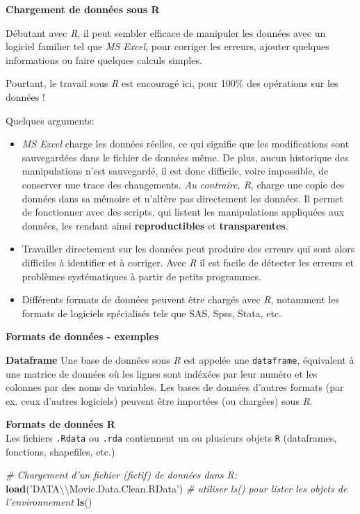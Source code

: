 \documentclass[]{book}
\newenvironment{Shaded}{\begin{snugshade}}{\end{snugshade}}
\newcommand{\CharTok}[1]{\textcolor[rgb]{0.31,0.60,0.02}{#1}}
\newcommand{\CommentTok}[1]{\textcolor[rgb]{0.56,0.35,0.01}{\textit{#1}}}
\newcommand{\KeywordTok}[1]{\textcolor[rgb]{0.13,0.29,0.53}{\textbf{#1}}}
\newcommand{\NormalTok}[1]{#1}
\newcommand{\StringTok}[1]{\textcolor[rgb]{0.31,0.60,0.02}{#1}}
\providecommand{\tightlist}{%
  \setlength{\itemsep}{0pt}\setlength{\parskip}{0pt}}
\begin{document}
\textbf{Chargement de données sous R}

Débutant avec \emph{R}, il peut sembler efficace de manipuler les données avec un logiciel familier tel que \emph{MS Excel}, pour corriger les erreurs, ajouter quelques informations ou faire quelques calculs simples.

Pourtant, le travail sous \emph{R} est encouragé ici, pour 100\% des opérations sur les données !

Quelques arguments:

\begin{itemize}
\tightlist
\item
  \emph{MS Excel} charge les données réelles, ce qui signifie que les modifications sont sauvegardées dans le fichier de données même. De plus, aucun historique des manipulations n'est sauvegardé, il est donc difficile, voire impossible, de conserver une trace des changements. \emph{Au contraire, R}, charge une copie des données dans sa mémoire et n'altère pas directement les données. Il permet de fonctionner avec des scripts, qui listent les manipulations appliquées aux données, les rendant ainsi \textbf{reproductibles} et \textbf{transparentes}.\\
\item
  Travailler directement sur les données peut produire des erreurs qui sont alors difficiles à identifier et à corriger. Avec \emph{R} il est facile de détecter les erreurs et problèmes systématiques à partir de petits programmes.\\
\item
  Différents formats de données peuvent être chargés avec \emph{R}, notamment les formats de logiciels spécialisés tels que SAS, Spss, Stata, etc.
\end{itemize}

\textbf{Formats de données - exemples}

\textbf{Dataframe}
Une base de données sous \emph{R} est appelée une \texttt{dataframe}, équivalent à une matrice de données où les lignes sont indéxées par leur numéro et les colonnes par des noms de variables.
Les bases de données d'autres formats (par ex. ceux d'autres logiciels) peuvent être importées (ou chargées) sous \emph{R}.

\textbf{Formats de données R}\\
Les fichiers \texttt{.Rdata} ou \texttt{.rda} contiennent un ou plusieurs objets \texttt{R} (dataframes, fonctions, shapefiles, etc.)

\begin{Shaded}
\begin{Highlighting}[]
\CommentTok{# Chargement d'un fichier (fictif) de données dans R: }
\KeywordTok{load}\NormalTok{(}\StringTok{'DATA}\CharTok{\textbackslash{}\textbackslash{}}\StringTok{Movie.Data.Clean.RData'}\NormalTok{)}
\CommentTok{# utiliser ls() pour lister les objets de l'environnement}
\KeywordTok{ls}\NormalTok{()}
\end{Highlighting}
\end{Shaded}
\end{document}
